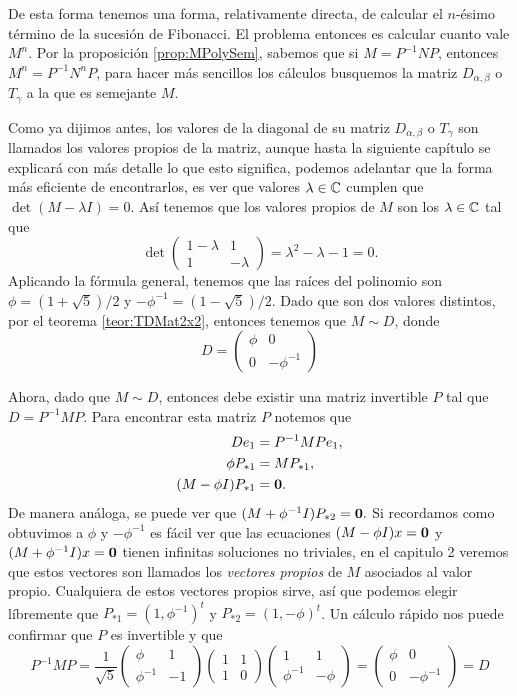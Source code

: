 De esta forma tenemos una forma, relativamente directa, de calcular el $n$-ésimo término de la sucesión de Fibonacci. El problema entonces es calcular cuanto vale $M^n$. Por la proposición \ref{prop:MPolySem}, sabemos que si $M = P^{-1}NP$, entonces $M^n = P^{-1} N^n P$, para hacer más sencillos los cálculos busquemos la matriz $D_{\alpha,\beta}$ o $T_\gamma$ a la que es semejante $M$.

Como ya dijimos antes, los valores de la diagonal de su matriz $D_{\alpha,\beta}$ o $T_\gamma$ son llamados los valores propios de la matriz, aunque hasta la siguiente capítulo se explicará con más detalle lo que esto significa, podemos adelantar que la forma más eficiente de encontrarlos, es ver que valores $\lambda \in \mathbb{C}$ cumplen que $\det(M-\lambda I) = 0$. Así tenemos que los valores propios de $M$ son los $\lambda \in \mathbb{C}$ tal que
\[
  \det\begin{pmatrix} 1-\lambda & 1 \\ 1 & -\lambda \end{pmatrix} = \lambda^2 - \lambda - 1 = 0.
\]
Aplicando la fórmula general, tenemos que las raíces del polinomio son $\phi = (1+\sqrt{5})/2$ y $-\phi^{-1} = (1-\sqrt{5})/2$. Dado que son dos valores distintos, por el teorema \ref{teor:TDMat2x2}, entonces tenemos que $M \sim D$, donde
\[
  D = \begin{pmatrix}
    \phi & 0 \\
    0 & -\phi^{-1}
  \end{pmatrix}
\]

Ahora, dado que $M \sim D$, entonces debe existir una matriz invertible $P$ tal que $D = P^{-1} M P$. Para encontrar esta matriz $P$ notemos que
\begin{align*}
  De_1 &=  P^{-1} M Pe_1, \\
  \phi P_{*1} &= M P_{*1}, \\
  (M - \phi I)P_{*1} &= \mathbf{0}.
\end{align*}
De manera análoga, se puede ver que $(M + \phi^{-1} I)P_{*2} = \mathbf{0}.$ Si recordamos como obtuvimos a $\phi$ y $-\phi^{-1}$ es fácil ver que las ecuaciones $(M - \phi I)x = \mathbf{0}$ y $(M + \phi^{-1} I)x = \mathbf{0}$ tienen infinitas soluciones no triviales, en el capitulo 2 veremos que estos vectores son llamados los \emph{vectores propios} de $M$ asociados al valor propio. Cualquiera de estos vectores propios sirve, así que podemos elegir líbremente que $P_{*1} = (1, \phi^{-1})^t$ y $P_{*2} = (1, -\phi)^t$. Un cálculo rápido nos puede confirmar que $P$ es invertible y que
\[
  P^{-1} M P = 
  \frac{1}{\sqrt{5}}\begin{pmatrix} \phi & 1 \\ \phi^{-1} & -1 \end{pmatrix}
  \begin{pmatrix} 1 & 1 \\ 1 & 0 \end{pmatrix}
  \begin{pmatrix} 1 & 1 \\ \phi^{-1} & -\phi \end{pmatrix} =
  \begin{pmatrix} \phi & 0 \\ 0 & -\phi^{-1} \end{pmatrix} = D
\]

